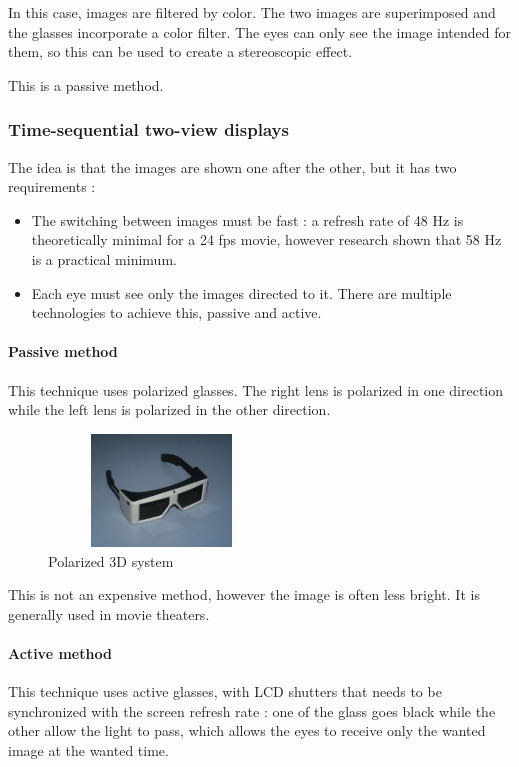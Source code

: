 In this case, images are filtered by color. The two images are superimposed and the glasses incorporate a color filter. The eyes can only see the image intended for them, so this can be used to create a stereoscopic effect. 

This is a passive method.

\subsubsection{Time-sequential two-view displays}
The idea is that the images are shown one after the other, but it has two requirements : 
\begin{itemize}
\item The switching between images must be fast : a refresh rate of 48 Hz is theoretically minimal for a 24 fps movie, however research \cite{holliman2011three} shown that 58 Hz is a practical minimum.
\item Each eye must see only the images directed to it. There are multiple technologies to achieve this, passive and active.
\end{itemize}

\paragraph{Passive method}
This technique uses polarized glasses. The right lens is polarized in one direction while the left lens is polarized in the other direction. 

\begin{figure}[h!]
\begin{center}
\begin{minipage}{1\linewidth}
\centering\includegraphics[width=6cm,height=30mm]{image/2.jpg}
\caption{Polarized 3D system\cite{Polarized3D}}
\end{minipage}
\end{center}
\end{figure}

This is not an expensive method, however the image is often less bright. It is generally used in movie theaters.

\paragraph{Active method}
This technique uses active glasses, with LCD shutters that needs to be synchronized with the screen refresh rate : one of the glass goes black while the other allow the light to pass, which allows the eyes to receive only the wanted image at the wanted time.


